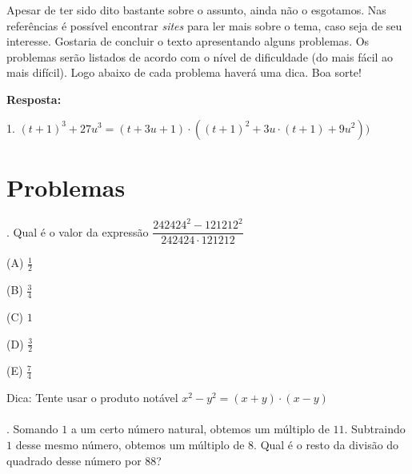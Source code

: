 \documentclass[a4paper, 12pt]{article}
\begin{document}
\noindent Apesar de ter sido dito bastante sobre o assunto, ainda não o esgotamos. Nas referências é possível encontrar \textit{sites} para ler mais sobre o tema, caso seja de seu interesse. Gostaria de concluir o texto apresentando alguns problemas. Os problemas serão listados de acordo com o nível de dificuldade (do mais fácil ao mais difícil). Logo abaixo de cada problema haverá uma dica. Boa sorte!


\textbf{Resposta:}

\begin{flushleft}

1. \((t+1)^3 + 27u^3 = (t+3u+1)\cdot{((t+1)^2 + 3u\cdot{(t+1)} + 9u^2))}\)

\end{flushleft}


\section{Problemas}

  	
{}. Qual é o valor da expressão \(\dfrac{242424^2 - 121212^2}{242424\cdot{121212}}\)
		
\begin{flushleft}	
		
(A)	\(\frac{1}{2}\)

(B)	\(\frac{3}{4}\)

(C)	\(1\)

(D)	\(\frac{3}{2}\)

(E)	\(\frac{7}{4}\) 

\end{flushleft}

\noindent Dica: Tente usar o produto notável \(x^2 - y^2 = (x + y)\cdot{(x - y)}\) \\ \\


{}. Somando \(1\) a um certo número natural, obtemos um múltiplo de \(11\). Subtraindo \(1\) desse mesmo número, obtemos um múltiplo de \(8\). Qual é o resto da divisão do quadrado desse número por \(88\)? \\ \\ 
\end{document}
